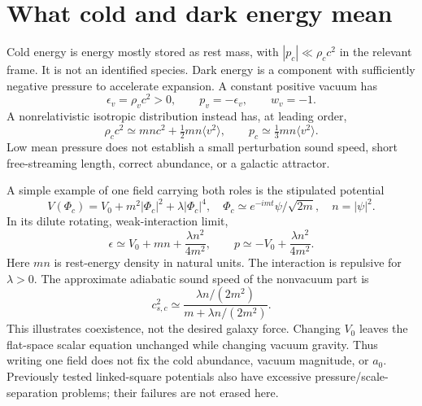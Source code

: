 \documentclass[11pt]{article}
\begin{document}
\section{What cold and dark energy mean}
Cold energy is energy mostly stored as rest mass, with
$|p_c|\ll\rho_c c^2$ in the relevant frame. It is not an identified species.
Dark energy is a component with sufficiently negative pressure to accelerate
expansion. A constant positive vacuum has
\begin{equation}
 \epsilon_v=\rho_v c^2>0,\qquad p_v=-\epsilon_v,\qquad w_v=-1.
\end{equation}
A nonrelativistic isotropic distribution instead has, at leading order,
\begin{equation}
 \rho_c c^2\simeq mn c^2+\tfrac12 mn\langle v^2\rangle,
 \qquad p_c\simeq\tfrac13 mn\langle v^2\rangle.
\end{equation}
Low mean pressure does not establish a small perturbation sound speed,
short free-streaming length, correct abundance, or a galactic attractor.

A simple example of one field carrying both roles is the stipulated potential
\begin{equation}
 V(\Phi_c)=V_0+m^2|\Phi_c|^2+\lambda|\Phi_c|^4,\quad
 \Phi_c\simeq e^{-imt}\psi/\sqrt{2m},\quad n=|\psi|^2.
\end{equation}
In its dilute rotating, weak-interaction limit,
\begin{equation}
 \epsilon\simeq V_0+mn+\frac{\lambda n^2}{4m^2},\qquad
 p\simeq-V_0+\frac{\lambda n^2}{4m^2}.
\end{equation}
Here $mn$ is rest-energy density in natural units. The interaction is
repulsive for $\lambda>0$. The approximate adiabatic sound speed of the
nonvacuum part is
\begin{equation}
 c_{s,c}^2\simeq
 \frac{\lambda n/(2m^2)}{m+\lambda n/(2m^2)}.
\end{equation}
This illustrates coexistence, not the desired galaxy force. Changing $V_0$
leaves the flat-space scalar equation unchanged while changing vacuum gravity.
Thus writing one field does not fix the cold abundance, vacuum magnitude,
or $a_0$. Previously tested linked-square potentials also have excessive
pressure/scale-separation problems; their failures are not erased here.
\end{document}
